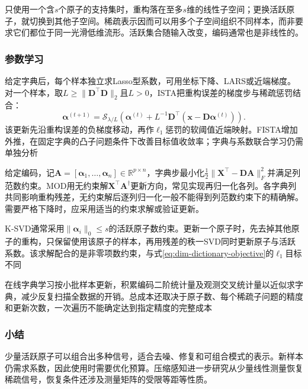 只使用一个含$s$个原子的支持集时，重构落在至多$s$维的线性子空间；更换活跃原子，就切换到其他子空间。稀疏表示因而可以用多个子空间组织不同样本，而非要求它们都位于同一光滑低维流形。活跃集合随输入改变，编码通常也是非线性的。

\subsubsection{参数学习}
\label{sec:dim-sparse-coding-learning}

给定字典后，每个样本独立求Lasso型系数，可用坐标下降、LARS或近端梯度。对一个样本，取$L\geq\lVert\bm{D}^{\top}\bm{D}\rVert_2$且$L>0$，ISTA把重构误差的梯度步与稀疏惩罚结合：
\begin{equation}
  \bm{\alpha}^{(t+1)}
  =\mathcal{S}_{\lambda/L}\left(
      \bm{\alpha}^{(t)}
      +L^{-1}\bm{D}^{\top}
          (\bm{x}-\bm{D}\bm{\alpha}^{(t)})\right).
  \label{eq:dim-ista}
\end{equation}
该更新先沿重构误差的负梯度移动，再作$\ell_1$惩罚的软阈值近端映射。FISTA增加外推，在固定字典的凸子问题条件下改善目标值收敛率；字典与系数联合学习仍需单独分析

给定编码，记$\bm{A}=[\bm{\alpha}_1,\ldots,\bm{\alpha}_n]\in\mathbb{R}^{p\times n}$，字典步最小化$\frac12\lVert\bm{X}^{\top}-\bm{D}\bm{A}\rVert_F^2$并满足列范数约束。MOD用无约束解$\bm{X}^{\top}\bm{A}^{\dagger}$更新方向，常见实现再归一化各列。各字典列共同影响重构残差，无约束解后逐列归一化一般不能得到列范数约束下的精确解。需要严格下降时，应采用适当的约束求解或验证更新。

K-SVD通常采用$\lVert\bm{\alpha}_i\rVert_0\leq s$的活跃原子数约束。更新一个原子时，先去掉其他原子的重构，只保留使用该原子的样本，再用残差的秩一SVD同时更新原子与活跃系数。该求解配合的是非零项数约束，与式\eqref{eq:dim-dictionary-objective}的$\ell_1$目标不同

在线字典学习按小批样本更新，积累编码二阶统计量及观测交叉统计量以近似求字典，减少反复扫描全数据的开销。总成本还取决于原子数、每个稀疏子问题的精度和更新次数，一次遍历不能确定达到指定精度的完整成本

\subsubsection{小结}
\label{sec:dim-sparse-coding-summary}

少量活跃原子可以组合出多种信号，适合去噪、修复和可组合模式的表示。新样本仍需求系数，因此使用时需要优化预算。压缩感知进一步研究从少量线性测量恢复稀疏信号，恢复条件还涉及测量矩阵的受限等距等性质。

